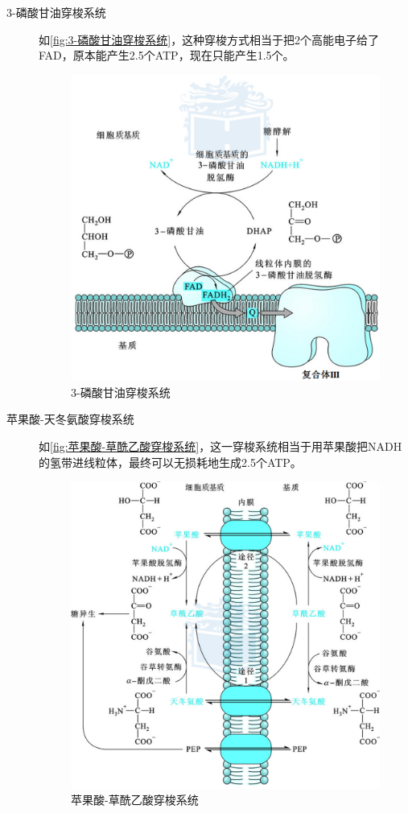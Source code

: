 \begin{description}
	\item[3-磷酸甘油穿梭系统] 如\autoref{fig:3-磷酸甘油穿梭系统}，这种穿梭方式相当于把2个高能电子给了FAD，原本能产生2.5个ATP，现在只能产生1.5个。
	
	\begin{figure}[htbp]
		\centering
		\includegraphics[width=0.7\linewidth]{Pics/3-磷酸甘油穿梭系统}
		\caption{3-磷酸甘油穿梭系统}
		\label{fig:3-磷酸甘油穿梭系统}
	\end{figure}
	
	\item[苹果酸-天冬氨酸穿梭系统] 如\autoref{fig:苹果酸-草酰乙酸穿梭系统}，这一穿梭系统相当于用苹果酸把NADH的氢带进线粒体，最终可以无损耗地生成2.5个ATP。
	
	\begin{figure}[htbp]
		\centering
		\includegraphics[width=0.9\linewidth]{Pics/苹果酸-草酰乙酸穿梭系统}
		\caption{苹果酸-草酰乙酸穿梭系统}
		\label{fig:苹果酸-草酰乙酸穿梭系统}
	\end{figure}
	
\end{description}

